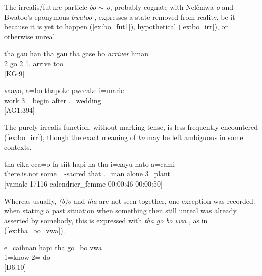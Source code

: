 The irrealis\slash future particle \textit{bo} $\sim$ \textit{o}, probably cognate with Nelêmwa \textit{o}  and Bwatoo's eponymous \textit{bwatoo} , expresses a state removed from reality, be it because it is yet to happen (\ref{ex:bo_fut1}), hypothetical (\ref{ex:bo_irr}), or otherwise unreal. 

\ea \label{ex:bo_fut1}
	\gll tha gau han tha gau tha gase bo \textit{arriver} hman\\
	  2 go  2  1.  arrive too \\
	\glt {} {[KG:9]} 
  \z

\ea\label{ex:bo_fut2}
 \gll vaaya, a=bo thapoke pwecake i=marie\\
  work 3= begin after .=wedding\\
 \glt {} {[AG1:394]}
  \z 
 
 The purely irrealis function, without marking tense, is less frequently encountered (\ref{ex:bo_irr}), though the exact meaning of \textit{bo} may be left ambiguous in some contexts.
    
 \ea \label{ex:bo_irr}
 \gll tha cika eca=o fa-siit hapi na tha i=xayu hato a=cami\\
   there.is.not some= -sacred that   .=man alone 3=plant\\
 \glt {} {[vamale-17116-calendrier\_femme 00:00:46-00:00:50]}
\z

Whereas usually, \textit{(b)o}  and \textit{tha}  are not seen together, one exception was recorded: when stating a past situation when something then still unreal was already asserted by somebody, this is expressed with \textit{tha go bo vwa} , as in (\ref{ex:tha_bo_vwa}). 

\ea \label{ex:tha_bo_vwa} 
\gll e=caihnan hapi tha go=bo vwa\\
 1=know   2= do\\
\glt {} {[D6:10]}
\z


